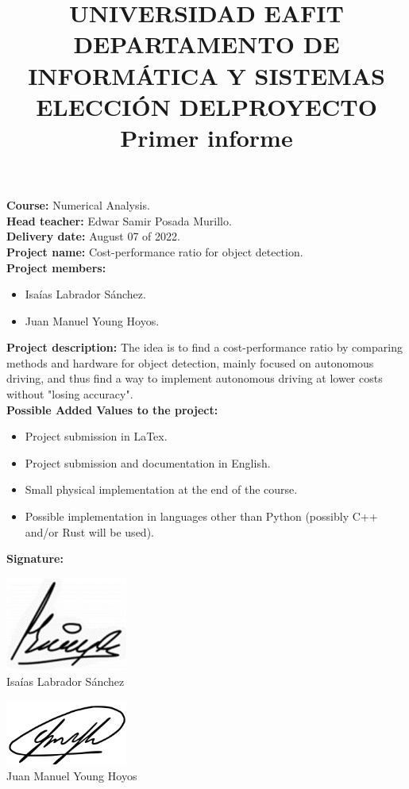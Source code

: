 \documentclass[11pt, letterpaper, twoside]{article}
\title{\vspace{-4.0cm}
UNIVERSIDAD EAFIT
DEPARTAMENTO DE INFORMÁTICA Y SISTEMAS
ELECCIÓN DELPROYECTO\\


\large Primer informe
}
\begin{document}
\maketitle

\noindent\textbf{Course:} Numerical Analysis.\\
\textbf{Head teacher:} Edwar Samir Posada Murillo.\\
\textbf{Delivery date:} August 07 of 2022.\\
\textbf{Project name:} Cost-performance ratio for object detection.\\
\textbf{Project members:}
\begin{itemize}
    \item Isaías Labrador Sánchez.
    \item Juan Manuel Young Hoyos.
\end{itemize}
\textbf{Project description:} The idea is to find a cost-performance ratio by
comparing methods and hardware for object detection, mainly focused on
autonomous driving, and thus find a way to implement autonomous driving at lower
costs without "losing accuracy".\\
\textbf{Possible Added Values to the project:} 
\begin{itemize}
    \item Project submission in LaTex.
    \item Project submission and documentation in English.
    \item Small physical implementation at the end of the course.
    \item Possible implementation in languages other than Python (possibly C++
    and/or Rust will be used).
\end{itemize}
\textbf{Signature:}

\vfill  %
\noindent \parbox[t]{0.5\linewidth}{%
    \underline{
        \includegraphics[width=0.3\textwidth]{01}
    }\\
    Isaías Labrador Sánchez \\
    \vspace{2cm} %
} 
\parbox[t]{0.45\linewidth}{%
    \underline{
        \includegraphics[width=0.3\textwidth]{00}
    }\\
    Juan Manuel Young Hoyos \\
}
\end{document}
